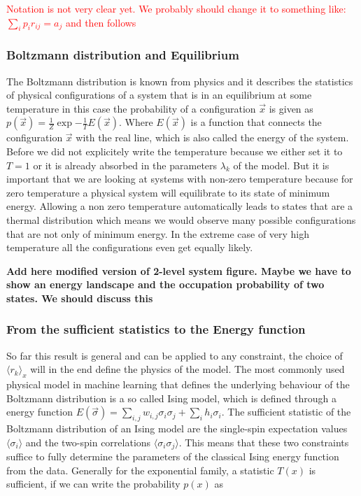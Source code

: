 \documentclass[nofootinbib, superscriptaddress, prl]{revtex4}
\begin{document}
\textcolor{red}{Notation is not very clear yet. We probably should change it to something like: $\sum_i p_i r_{ij} = a_j$ and then follows }

\subsubsection{Boltzmann distribution and Equilibrium}

The Boltzmann distribution is known from physics and it describes the statistics of physical configurations of a system that is in an equilibrium at some temperature in this case the probability of a configuration $\vec{x}$ is given as $p(\vec{x}) = \frac{1}{Z} \exp{- \frac{1}{T} E(\vec{x})}$. Where $E(\vec{x})$ is a function that connects the configuration $\vec{x}$ with the real line, which is also called the energy of the system. Before we did not explicitely write the temperature because we either set it to $T=1$ or it is already absorbed in the parameters $\lambda_k$ of the model. But it is important that we are looking at systems with non-zero temperature because for zero temperature a physical system will equilibrate to its state of minimum energy. Allowing a non zero temperature automatically leads to states that are a thermal distribution which means we would observe many possible configurations that are not only of minimum energy. In the extreme case of very high temperature all the configurations even get equally likely.  

\textbf{Add here modified version of 2-level system figure. Maybe we have to show an energy landscape and the occupation probability of two states. We should discuss this}

\subsubsection{From the sufficient statistics to the Energy function}

So far this result is general and can be applied to any constraint, the choice of $\langle r_k \rangle_x$ will in the end define the physics of the model. The most commonly used physical model in machine learning that defines the underlying behaviour of the Boltzmann distribution is a so called Ising model, which is defined through a energy function $E(\vec {\sigma}) = \sum_{i,j} w_{i,j} \sigma_i \sigma_j + \sum_i h_i \sigma_i$. 
The sufficient statistic of the Boltzmann distribution of an Ising model are the single-spin expectation values $\langle \sigma_i \rangle$ and the two-spin correlations $\langle \sigma_i \sigma_j \rangle$. This means that these two constraints suffice to fully determine the parameters of the classical Ising energy function from the data.
Generally for the exponential family, a statistic $T(x)$ is sufficient, if we can write the probability $p(x)$ as
\end{document}
